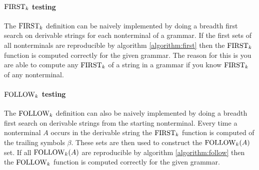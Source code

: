 \paragraph{\texorpdfstring{$\text{FIRST}_k$}{TEXT} testing}
The $\text{FIRST}_k$ definition can be naively implemented by doing a breadth first search on derivable strings for each nonterminal of a grammar. If the first sets of all nonterminals are reproducible by algorithm \ref{algorithm:first} then the $\text{FIRST}_k$ function is computed correctly for the given grammar. The reason for this is you are able to compute any $\text{FIRST}_k$ of a string in a grammar if you know $\text{FIRST}_k$ of any nonterminal.

\paragraph{\texorpdfstring{$\text{FOLLOW}_k$}{TEXT} testing}
The $\text{FOLLOW}_k$ definition can also be naively implemented by doing a breadth first search on derivable strings from the starting nonterminal. Every time a nonterminal $A$ occurs in the derivable string the $\text{FIRST}_k$ function is computed of the trailing symbols $\beta$. These sets are then used to construct the $\text{FOLLOW}_k(A)$ set. If all $\text{FOLLOW}_k(A)$ are reproducible by algorithm \ref{algorithm:follow} then the $\text{FOLLOW}_k$ function is computed correctly for the given grammar.

